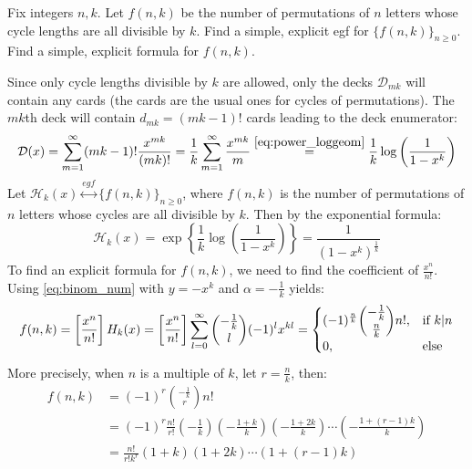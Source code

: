 \begin{exercise}
    Fix integers $n,k$. Let $f(n,k)$ be the number of permutations of $n$ letters whose cycle lengths are all divisible by $k$. Find a simple, explicit egf for $\{f(n,k)\}_{n\geq 0}$. Find a simple, explicit formula for $f(n,k)$.
\end{exercise}
\begin{solution}
    Since only cycle lengths divisible by $k$ are allowed, only the decks $\mathcal{D}_{mk}$ will contain any cards (the cards are the usual ones for cycles of permutations). The $mk$th deck will contain $d_{mk} = (mk-1)!$ cards leading to the deck enumerator:
    \[
        \mathcal{D}(x) = \sum_{m=1}^\infty (mk-1)! \frac{x^{mk}}{(mk)!} = \frac{1}{k}\sum_{m=1}^\infty \frac{x^{mk}}{m} \estep{\eqref{eq:power_loggeom}} \frac{1}{k} \log\left(\frac{1}{1-x^k}\right)
    \]
    Let $\mathcal{H}_k(x) \stackrel{egf}{\longleftrightarrow} \{f(n,k)\}_{n\geq 0}$, where $f(n,k)$ is the number of permutations of $n$ letters whose cycles are all divisible by $k$. Then by the exponential formula:
    \[
        \mathcal{H}_k(x) = \exp\left\{ \frac{1}{k}\log\left(\frac{1}{1-x^k}\right)\right\} = \frac{1}{(1-x^k)^{\frac{1}{k}}}
    \]
    To find an explicit formula for $f(n,k)$, we need to find the coefficient of $\frac{x^n}{n!}$. Using \eqref{eq:binom_num} with $y=-x^k$ and $\alpha = -\frac{1}{k}$ yields:
    \begin{align*}
        f(n, k) = \coeff{\expcoeff}H_k(x) = \coeff{\frac{x^n}{n!}} \bsum[l] \binom{-\frac{1}{k}}{l} (-1)^l x^{kl}= \begin{cases}
            (-1)^{\frac{n}{k}} \displaystyle\binom{-\frac{1}{k}}{\frac{n}{k}}n!, & \textnormal{if $k\vert n$} \\
            0, & \textnormal{else}
        \end{cases}
    \end{align*}
    More precisely, when $n$ is a multiple of $k$, let $r = \frac{n}{k}$, then:
    \begin{align*}
        f(n,k) &= (-1)^r \binom{-\frac{1}{k}}{r}n! \\
        &= (-1)^r \frac{n!}{r!}\left(-\frac{1}{k}\right)\left(-\frac{1+k}{k}\right)\left(-\frac{1+2k}{k}\right)\cdots\left(-\frac{1+(r-1)k}{k}\right) \\
        &= \frac{n!}{r!k^r}(1+k)(1+2k)\cdots(1+(r-1)k)
    \end{align*}
\end{solution}

